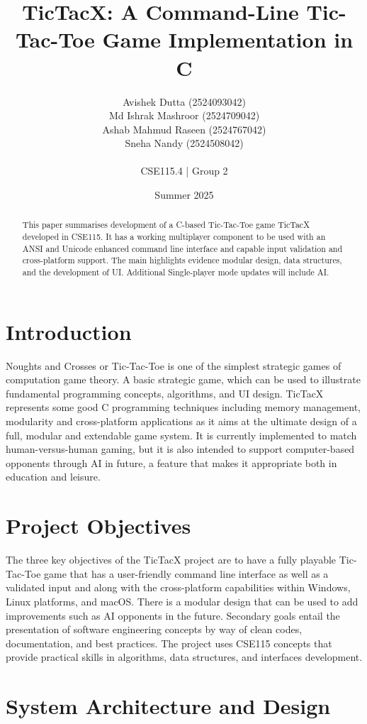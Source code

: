 \documentclass[11pt,a4paper,twocolumn]{article}
\title{\textbf{TicTacX: A Command-Line Tic-Tac-Toe Game Implementation in C}}
\author{
    Avishek Dutta (2524093042) \\
    Md Ishrak Mashroor (2524709042) \\
    Ashab Mahmud Raseen (2524767042) \\
    Sneha Nandy (2524508042) \\
    \\
    \small CSE115.4 | Group 2
}
\date{Summer 2025}
\begin{document}
\maketitle

\begin{abstract}
This paper summarises development of a C-based Tic-Tac-Toe game TicTacX developed in CSE115. It has a working multiplayer component to be used with an ANSI and Unicode enhanced command line interface and capable input validation and cross-platform support. The main highlights evidence modular design, data structures, and the development of UI. Additional Single-player mode updates will include AI.
\end{abstract}

\section{Introduction}

Noughts and Crosses or Tic-Tac-Toe is one of the simplest strategic games of computation game theory. A basic strategic game, which can be used to illustrate fundamental programming concepts, algorithms, and UI design. TicTacX represents some good C programming techniques including memory management, modularity and cross-platform applications as it aims at the ultimate design of a full, modular and extendable game system. It is currently implemented to match human-versus-human gaming, but it is also intended to support computer-based opponents through AI in future, a feature that makes it appropriate both in education and leisure.

\section{Project Objectives}

The three key objectives of the TicTacX project are to have a fully playable Tic-Tac-Toe game that has a user-friendly command line interface as well as a validated input and along with the cross-platform capabilities within Windows, Linux platforms, and macOS. There is a modular design that can be used to add improvements such as AI opponents in the future. Secondary goals entail the presentation of software engineering concepts by way of clean codes, documentation, and best practices. The project uses CSE115 concepts that provide practical skills in algorithms, data structures, and interfaces development.

\section{System Architecture and Design}
\end{document}
